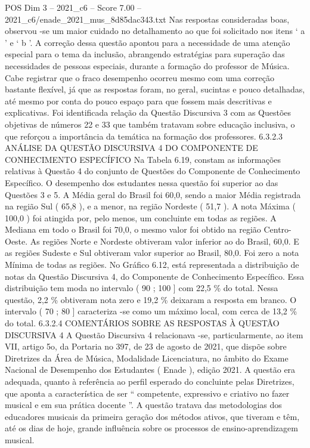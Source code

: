 \begin{textsample}{POS Dim 3 – 2021\_c6 – Score 7.00 – 2021\_c6/enade\_2021\_mus\_8d85dac343.txt}
Nas respostas consideradas boas, observou -se um maior cuidado no detalhamento ao que foi solicitado nos itens ‘ a ’ e ‘ b ’.
A correção dessa questão apontou para a necessidade de uma atenção especial para o tema da inclusão, abrangendo estratégias para superação das necessidades de pessoas especiais, durante a formação do professor de Música.
Cabe registrar que o fraco desempenho ocorreu mesmo com uma correção bastante flexível, já que as respostas foram, no geral, sucintas e pouco detalhadas, até mesmo por conta do pouco espaço para que fossem mais descritivas e explicativas.
Foi identificada relação da Questão Discursiva 3 com as Questões objetivas de números 22 e 33 que também tratavam sobre educação inclusiva, o que reforçou a importância da temática na formação dos professores. 6.3.2.3 ANÁLISE DA QUESTÃO DISCURSIVA 4 DO COMPONENTE DE CONHECIMENTO ESPECÍFICO Na Tabela 6.19, constam as informações relativas à Questão 4 do conjunto de Questões do Componente de Conhecimento Específico.
O desempenho dos estudantes nessa questão foi superior ao das Questões 3 e 5.
A Média geral do Brasil foi 60,0, sendo a maior Média registrada na região Sul ( 65,8 ), e a menor, na região Nordeste ( 51,7 ).
A nota Máxima ( 100,0 ) foi atingida por, pelo menos, um concluinte em todas as regiões.
A Mediana em todo o Brasil foi 70,0, o mesmo valor foi obtido na região Centro-Oeste.
As regiões Norte e Nordeste obtiveram valor inferior ao do Brasil, 60,0.
E as regiões Sudeste e Sul obtiveram valor superior ao Brasil, 80,0.
Foi zero a nota Mínima de todas as regiões.
No Gráfico 6.12, está representada a distribuição de notas da Questão Discursiva 4, do Componente de Conhecimento Específico.
Essa distribuição tem moda no intervalo ( 90 ; 100 ] com 22,5 \% do total.
Nessa questão, 2,2 \% obtiveram nota zero e 19,2 \% deixaram a resposta em branco.
O intervalo ( 70 ; 80 ] caracteriza -se como um máximo local, com cerca de 13,2 \% do total. 6.3.2.4 COMENTÁRIOS SOBRE AS RESPOSTAS À QUESTÃO DISCURSIVA 4 A Questão Discursiva 4 relacionava -se, particularmente, ao item VII, artigo 5o, da Portaria no 397, de 23 de agosto de 2021, que dispõe sobre Diretrizes da Área de Música, Modalidade Licenciatura, no âmbito do Exame Nacional de Desempenho dos Estudantes ( Enade ), edição 2021.
A questão era adequada, quanto à referência ao perfil esperado do concluinte pelas Diretrizes, que aponta a característica de ser “ competente, expressivo e criativo no fazer musical e em sua prática docente ”.
A questão tratava das metodologias dos educadores musicais da primeira geração dos métodos ativos, que tiveram e têm, até os dias de hoje, grande influência sobre os processos de ensino-aprendizagem musical.

\end{textsample}
